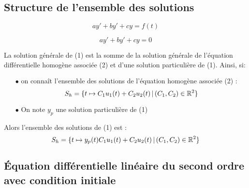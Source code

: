 \documentclass[a4paper, 11pt]{article}
\begin{document}
%


\subsection{Structure de l'ensemble des solutions}

 {\noindent  
 \begin{equation}
  ay'+by'+cy=f(t)
 \end{equation}
 
  \begin{equation}
  ay'+by'+cy=0
 \end{equation}

\begin{theorem} 
La solution g\'en\'erale de (1) est la somme de la solution g\'en\'erale de l'\'equation diff\'erentielle homog\`ene associ\'ee (2) et d'une solution particuli\`ere de (1). Ainsi, si: 
\begin{itemize}
\item[$\bullet$] on conna\^{i}t l'ensemble des solutions de l'\'equation homog\`ene associ\'ee (2) : $$S_h=\{ t\mapsto C_1u_1(t)+ C_2u_2(t)\, |\,  (C_1,C_2)\in \mathbb{R}^2\}$$
\item[$\bullet$] On note $y_p$ une solution particuli\`ere de (1) 
\end{itemize}
\vsec
Alors l'ensemble des solutions de (1) est : $$S_h=\{ t\mapsto y_p(t)  C_1u_1(t)+ C_2u_2(t)\, |\,  (C_1,C_2)\in \mathbb{R}^2\}$$
\end{theorem}
 
}\vsec\vsec

\setlength\fboxrule{1pt}
\setlength\fboxrule{0.5pt}

 
\subsection{\'Equation diff\'erentielle lin\'eaire du second ordre avec condition initiale}
\end{document}
